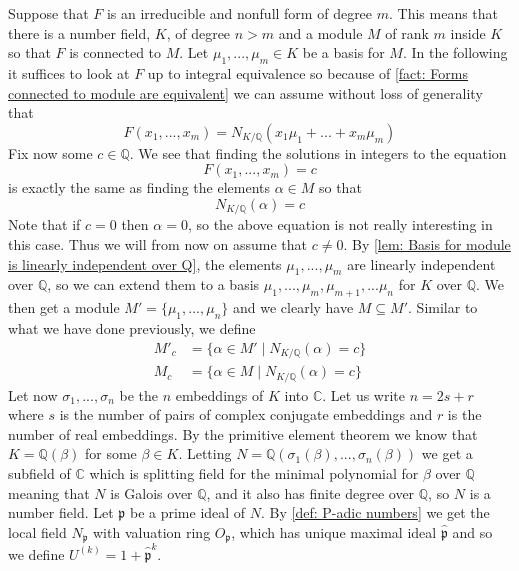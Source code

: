 \documentclass{article}
\newcommand{\mfrak}[1]{\mathfrak{#1}}
\newcommand{\mbb}[1]{\mathbb{#1}}
\numberwithin{equation}{section}
\begin{document}
Suppose that $F$ is an irreducible and nonfull form of degree $m$. This means that there is a number field, $K$, of degree $n > m$ and a module $M$ of rank $m$ inside $K$ so that $F$ is connected to $M$. Let $\mu_1, ..., \mu_m \in K$ be a basis for $M$. In the following it suffices to look at $F$ up to integral equivalence so because of \cref{fact: Forms connected to module are equivalent} we can assume without loss of generality that
\begin{equation*}
    F(x_1, ..., x_m) = N_{K / \mbb Q}(x_1 \mu_1 + ... + x_m \mu_m)
\end{equation*}
Fix now some $c \in \mbb Q$. We see that finding the solutions in integers to the equation
\begin{equation}\label{eq: Initial equation of interest}
    F(x_1, ..., x_m) = c
\end{equation}
is exactly the same as finding the elements $\alpha \in M$ so that
\begin{equation}
    N_{K / \mbb Q}(\alpha) = c
\end{equation}
Note that if $c = 0$ then $\alpha = 0$, so the above equation is not really interesting in this case. Thus we will from now on assume that $c \neq 0$. By \cref{lem: Basis for module is linearly independent over Q}, the elements $\mu_1, ..., \mu_m$ are linearly independent over $\mbb Q$, so we can extend them to a basis $\mu_1, ...,\mu_{m}, \mu_{m+1}, ... \mu_n$ for $K$ over $\mbb Q$. We then get a module $M' = \{ \mu_1, ..., \mu_n\}$ and we clearly have $M \subseteq M'$. Similar to what we have done previously, we define
\begin{align*}
    M'_c & = \{\alpha \in M' \mid N_{K / \mbb Q}(\alpha) = c \} \\
    M_c  & = \{\alpha \in M \mid N_{K / \mbb Q}(\alpha) = c \}
\end{align*}
Let now $\sigma_1, ..., \sigma_n$ be the $n$ embeddings of $K$ into $\mbb C$. Let us write $n = 2s + r$ where $s$ is the number of pairs of complex conjugate embeddings and $r$ is the number of real embeddings. By the primitive element theorem we know that $K = \mbb Q(\beta)$ for some $\beta \in K$. Letting $N = \mbb Q(\sigma_1(\beta), ..., \sigma_n(\beta))$ we get a subfield of $\mbb C$ which is splitting field for the minimal polynomial for $\beta$ over $\mbb Q$ meaning that $N$ is Galois over $\mbb Q$, and it also has finite degree over $\mbb Q$, so $N$ is a number field. Let $\mfrak p$ be a prime ideal of $N$. By \cref{def: P-adic numbers} we get the local field $N_{\mfrak p}$ with valuation ring $O_{\mfrak p}$, which has unique maximal ideal $\hat {\mfrak p}$ and so we define $U^{(k)} = 1 + \hat {\mfrak p}^k$.
\end{document}
